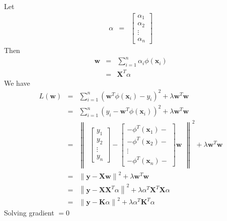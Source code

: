 \documentclass[12pt]{article}
\begin{document}
Let
\begin{eqnarray*}
  \alpha &=&
  \begin{bmatrix}
    \alpha_1 \\
    \alpha_2 \\
    \vdots \\
    \alpha_n
  \end{bmatrix}
\end{eqnarray*}
Then
\begin{eqnarray*}
  \textbf{w}
  &=& \sum_{i=1}^n \alpha_i \phi(\textbf{x}_i) \\
  &=& \textbf{X}^T \alpha
\end{eqnarray*}
We have
\begin{eqnarray*}
  L(\textbf{w})
  &=& \sum_{i=1}^n \left(\textbf{w}^T \phi(\textbf{x}_i) - y_i \right)^2
  + \lambda \textbf{w}^T \textbf{w} \\
  &=& \sum_{i=1}^n (y_i - \textbf{w}^T \phi(\textbf{x}_i))^2
  + \lambda \textbf{w}^T \textbf{w} \\
  &=& \left\lVert 
  \begin{matrix}
    \begin{bmatrix}
      y_1 \\
      y_2 \\
      \vdots \\
      y_n
    \end{bmatrix}
    -
    \begin{bmatrix}
    - \phi^T(\textbf{x}_1)- \\
    - \phi^T(\textbf{x}_2)- \\
    \vdots \\
    -\phi^T(\textbf{x}_n)- 
    \end{bmatrix}
    \textbf{w}
  \end{matrix}
  \right\rVert^2 + \lambda \textbf{w}^T \textbf{w} \\
  &=& \left\lVert \textbf{y} - \textbf{Xw} \right\rVert^2
  + \lambda \textbf{w}^T \textbf{w} \\
  &=& \left\lVert \textbf{y} - \textbf{X} \textbf{X}^T \alpha \right\rVert^2
  + \lambda \alpha^T \textbf{X}^T \textbf{X} \alpha \\
  &=& \left\lVert \textbf{y} - \textbf{K} \alpha \right\rVert^2
  + \lambda \alpha^T \textbf{K}^T \alpha
\end{eqnarray*}
Solving gradient $=0$
\end{document}
